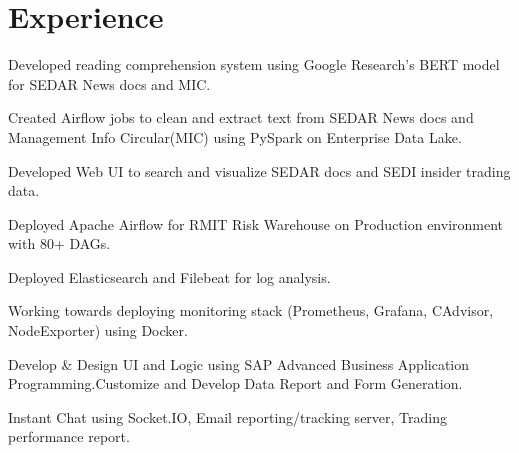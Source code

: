\documentclass[]{Vishnu-Resume}
\begin{document}
\hfill
\begin{minipage}[t]{0.66\textwidth} 


\section{Experience}

\vspace{\topsep} %
\begin{tightemize}
\item Developed reading comprehension system using Google Research's BERT model for SEDAR News docs and MIC.
\item Created Airflow jobs to clean and extract text from SEDAR News docs and Management Info Circular(MIC) using PySpark on Enterprise Data Lake. 
\item Developed Web UI to search and visualize SEDAR docs and SEDI insider trading data.
\end{tightemize}
\sectionsep

\begin{tightemize}\item Deployed Apache Airflow for RMIT Risk Warehouse on Production environment with 80+ DAGs.
\item Deployed Elasticsearch and Filebeat for log analysis.
\item Working towards deploying monitoring stack (Prometheus, Grafana, CAdvisor, NodeExporter) using Docker.
\end{tightemize}
\sectionsep

\begin{tightemize}\item Develop \& Design UI and Logic using SAP Advanced Business Application
Programming.Customize and Develop Data Report and Form Generation.
\end{tightemize}
\sectionsep

\begin{tightemize}\item Instant Chat using Socket.IO, Email reporting/tracking server, Trading performance report.
\end{tightemize}
\sectionsep


\end{minipage}
\end{document}
